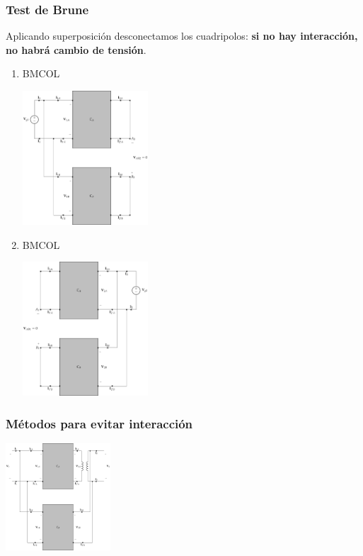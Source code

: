 \subsubsection{Test de Brune}
\label{sec:org199da56}
Aplicando superposición desconectamos los cuadripolos: \textbf{si no hay interacción, no habrá cambio de tensión}.
\begin{enumerate}
\item \hfill{}\textsc{BMCOL}
\label{sec:orge3bd0e3}
\begin{center}
\includegraphics[height=5cm]{../figs/paralelo-paralelo-brune-entrada2.pdf}
\end{center}
\item \hfill{}\textsc{BMCOL}
\label{sec:org745f22c}
\begin{center}
\includegraphics[height=5cm]{../figs/paralelo-paralelo-brune-salida2.pdf}
\end{center}
\end{enumerate}

\subsubsection{Métodos para evitar interacción}
\label{sec:org31cbc7e}
\begin{center}
\includegraphics[height=4cm]{../figs/paralelo-paralelo-transformador.pdf}
\end{center}

